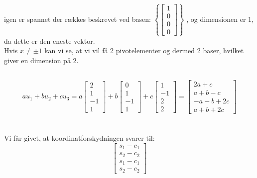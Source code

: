 \documentclass[a4paper,12pt]{article}
\begin{document}
igen er spannet der rækkes beskrevet ved basen: $\left\{ \left[\begin{array}{cc|c}
    1\\
    0\\
    0\\
    0 
\end{array}\right] \right\}$
, og dimensionen er 1, da dette er den eneste vektor.\\

Hvis $x \neq \pm 1$ kan vi se, at vi vil få 2 pivotelementer og dermed 2 baser, hvilket giver en dimension på 2.

\subsection{}

\[
au_1 + bu_2 + cu_3 = 
a
\left[\begin{array}{cc|c}
    2 \\
    1 \\
    -1 \\
    1 
\end{array}\right]
+
b
\left[\begin{array}{cc|c}
    0 \\
    1 \\
    -1 \\
    1 
\end{array}\right]
+
c
\left[\begin{array}{cc|c}
    1 \\
    -1 \\
    2 \\
    2 
\end{array}\right]
=
\left[\begin{array}{cc|c}
    2a + c \\
    a+b-c \\
    -a-b+2c \\
    a+b+2c
\end{array}\right]
\]

\section{}
\subsection{}

Vi får givet, at koordinatforskydningen svarer til:\\

\[
\left[\begin{array}{ccc}
    s_1-c_1\\
    s_2-c_2\\
    s_1-c_1\\
    s_2-c_2
\end{array}\right]
\]
\end{document}
